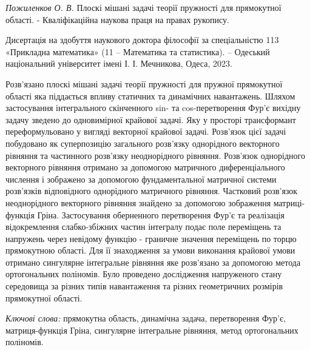 \textit{Пожиленков О. В.}
Плоскі мішані задачі теорії пружності для прямокутної області. - Кваліфікаційна наукова праця на правах рукопису.

Дисертація на здобуття наукового доктора філософії за спеціальністю 113 «Прикладна математика» (11 – Математика та статистика). – Одеський національний університет імені І. І. Мечникова, Одеса, 2023.

Розв'язано плоскі мішані задачі теорії пружності для пружної прямокутної області яка піддається впливу статичних та динамічних навантажень.
Шляхом застосування інтегрального скінченного sin- та cos-перетворення Фур'є вихідну задачу зведено до одновимірної крайової задачі.
Яку у просторі трансформант переформульовано у вигляді векторної крайової задачі.
Розв'язок цієї задачі побудовано як суперпозицію загального розв'язку однорідного векторного рівняння та частинного розв'язку неоднорідного рівняння.
Розв'язок однорідного векторного рівняння отримано за допомогою матричного диференціального числення і зображено за допомогою фундаментальної матричної системи розв'язків відповідного однорідного матричного рівняння.
Частковий розв'язок неоднорідного векторного рівняння знайдено за допомогою зображення матриці-функція Гріна.
Застосування оберненного перетворення Фур'є та реалізація відокремлення слабко-збіжних частин інтегралу подає поле переміщень та напружень через невідому функцію - граничне значення переміщень по торцю прямокутною області.
Для її знаходження за умови виконання крайової умови отримано сингулярне інтегральне рівняння яке розв'язано за допомогою метода ортогональних поліномів.
Було проведено дослідження напруженого стану середовища за різних типів навантаження та різних геометричних розмірів прямокутної області.

\textit{Ключові слова:}
прямокутна область, динамічна задача, перетворення Фур’є, матриця-функція Гріна, сингулярне інтегральне рівняння, метод ортогональних поліномів.
